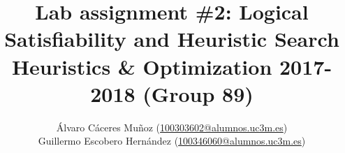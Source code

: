 \documentclass[a4paper,usenames,dvipsnames,table]{report}
\begin{document}
\title{
    {\Huge \textbf{Lab assignment \#2: Logical Satisfiability and Heuristic Search\\}}
    {\Large Heuristics \& Optimization 2017-2018 (Group 89)}
}
\author{
    Álvaro Cáceres Muñoz ({\normalsize \href{mailto:100303602@alumnos.uc3m.es}{100303602@alumnos.uc3m.es}})\\
    Guillermo Escobero Hernández ({\normalsize \href{mailto:100346060@alumnos.uc3m.es}{100346060@alumnos.uc3m.es}})\\
}
\date{}




\maketitle
\tableofcontents




\newpage\null\thispagestyle{empty}\newpage
\end{document}
